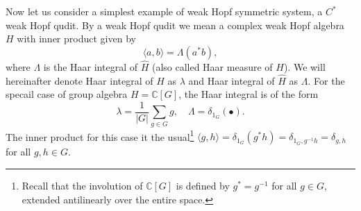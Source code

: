 \documentclass[a4paper,11pt]{article}
\theoremstyle{theorem}
\theoremstyle{remark}
\newcommand{\Cbb}{\mathbb{C}}
\begin{document}
Now let us consider a simplest example of weak Hopf symmetric system, a $C^*$ weak Hopf qudit.
By a weak Hopf qudit we mean a complex weak Hopf algebra $H$ with inner product given by
\begin{equation}
    \langle a,b\rangle=\Lambda(a^*b),
\end{equation}
where $\Lambda$ is the Haar integral of $\hat{H}$ (also called Haar measure of $H$).
We will hereinafter denote Haar integral of $H$ as $\lambda$ and Haar integral of $\hat{H}$ as $\Lambda$.
For the specail case of group algebra $H=\Cbb[G]$, the Haar integral is of the form
\begin{equation}
    \lambda=\frac{1}{|G|}\sum_{g\in G} g,\quad \Lambda=\delta_{1_G}(\bullet).
\end{equation}
The inner product for this case it the usual\footnote{Recall that the involution of $\mathbb{C}[G]$ is defined by $g^* = g^{-1}$ for all $g \in G$, extended antilinearly over the entire space.} $\langle g,h\rangle= \delta_{1_G}(g^*h)=\delta_{1_G, g^{-1}h}=\delta_{g,h}$ for all $g,h\in G$.
\end{document}
